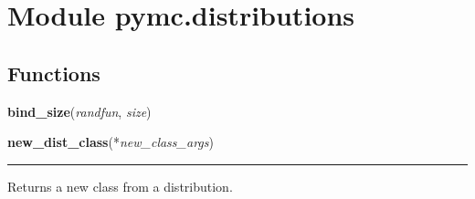 %
%
%


\section{Module pymc.distributions}

    \label{pymc:distributions}


  \subsection{Functions}

    \label{pymc:distributions:bind_size}

    \vspace{0.5ex}

    \begin{boxedminipage}{\textwidth}

    \raggedright \textbf{bind\_size}(\textit{randfun}, \textit{size})

    \end{boxedminipage}

    \label{pymc:distributions:new_dist_class}

    \vspace{0.5ex}

    \begin{boxedminipage}{\textwidth}

    \raggedright \textbf{new\_dist\_class}(*\textit{new\_class\_args})

    \vspace{-1.5ex}

    \rule{\textwidth}{0.5\fboxrule}

Returns a new class from a distribution.
    \vspace{1ex}

    \end{boxedminipage}

